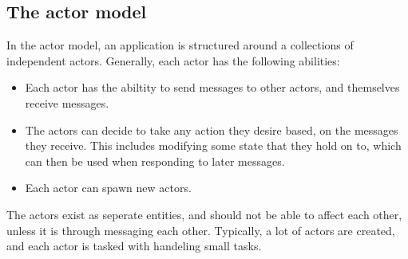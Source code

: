 \documentclass[a4paper]{article}
\begin{document}


\subsection{The actor model}
In the actor model, an application is structured around a collections of
independent actors. Generally, each actor has the following abilities:
\begin{itemize}
\item Each actor has the abiltity to send messages to other actors, and
  themselves receive messages.
\item The actors can decide to take any action they desire based, on the messages
  they receive. This includes modifying some state that they hold on to, which
  can then be used when responding to later messages.
\item Each actor can spawn new actors.
\end{itemize}

\noindent
The actors exist as seperate entities, and should not be able to affect each
other, unless it is through messaging each other. Typically, a lot of actors are
created, and each actor is tasked with handeling small tasks.\\
\end{document}
